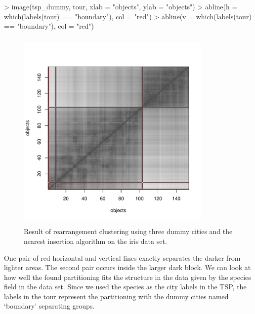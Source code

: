 \documentclass[10pt,a4paper,fleqn]{article}
\begin{document}
\begin{Schunk}
\begin{Sinput}
> image(tsp_dummy, tour, xlab = "objects", ylab = "objects")
> abline(h = which(labels(tour) == "boundary"), col = "red")
> abline(v = which(labels(tour) == "boundary"), col = "red")
\end{Sinput}
\end{Schunk}




\begin{figure}
\centering
\includegraphics[width=9.5cm, height=10cm, trim=0 20 0 0]{TSP-clustering}
\caption{Result of rearrangement clustering using three dummy cities and the 
nearest insertion algorithm on the iris data set.}
\label{fig:clustering}
\end{figure}


One pair of red horizontal and vertical lines exactly separates the darker from
lighter areas. The second pair occurs inside the larger dark block.  We can
look at how well the found partitioning fits the structure in the data given by
the species field in the data set. Since we used the species as the city labels
in the TSP, the labels in the tour represent the partitioning with the dummy
cities named `boundary' separating groups.
\end{document}

